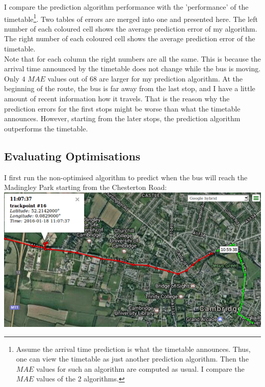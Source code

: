 \documentclass[12pt,a4paper,oneside,openright]{report}
\begin{document}
I compare the prediction algorithm performance with the 'performance' of the
timetable\footnote{Assume the arrival time prediction is what the timetable
announces. Thus, one can view the timetable as just another prediction 
algorithm. Then the $MAE$ values for such an algorithm are computed as usual. I compare
the $MAE$ values of the 2 algorithms.}.
Two tables of errors are merged into one and presented here. The left number
of each coloured cell shows the average prediction error of my algorithm. The 
right number of each coloured cell shows the average prediction error of the
timetable. \\

Note that for each column the right numbers are all the same. This is because the
arrival time announced by the timetable does not change while the bus is moving. \\

Only $4$ $MAE$ values out of $68$ are larger for my prediction algorithm. At the
beginning of the route, the bus is far away from the last stop, and I have a little amount
of recent information how it travels. That is the reason why the prediction errors
for the first stops might be worse than what the timetable announces. However, starting
from the later stops, the prediction algorithm outperforms the timetable.


\newpage
\subsection{Evaluating Optimisations}

I first run the non-optimised algorithm to predict when the bus will reach the
Madingley Park starting from the Chesterton Road: \\

\includegraphics[width=\textwidth]{figs/madingley.png} \\
\end{document}
